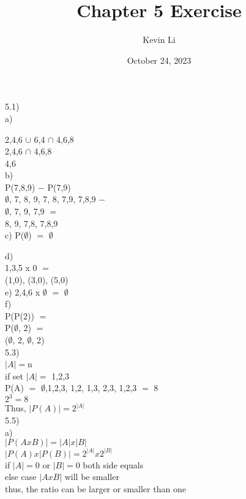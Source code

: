 \documentclass{article}
\title{Chapter 5 Exercise}
\author{Kevin Li}
\date{October 24, 2023}
\begin{document}
\maketitle
\pagebreak
\begin{spacing}{2}
  \begin{center}
  5.1)\\
  a)

  {2,4,6} $\cup$ {6,4} $\cap$ {4,6,8}\\
  {2,4,6} $\cap$ {4,6,8}\\
  {4,6}\\

  b)\\

  P({7,8,9}) $-$ P({7,9})\\
  {$\emptyset$, 7, 8, 9, {7, 8}, {7,9}, {7,8,9}} $-$\\
  {$\emptyset$, 7, 9, {7,9} $=$}\\
  {8, 9, {7,8}, {7,8,9}}\\

  c)
  P($\emptyset$) $=$ {$\emptyset$}
  
  d)\\
  {1,3,5} x {0} $=$\\
  {(1,0), (3,0), (5,0)}\\
  
  e)
  {2,4,6} x $\emptyset$ $=$
  $\emptyset$\\
  
  f)\\
  P(P({2})) $=$\\
  P($\emptyset$, 2) $=$\\
  ($\emptyset$, 2, {$\emptyset$, 2})\\

  5.3)\\
  $|A| = $n\\
  if set $|A| = $ {1,2,3}\\
  P(A) $=$ {$\emptyset$,1,2,3, {1,2}, {1,3}, {2,3}, {1,2,3}} $=$ 8\\
  $2^3 = 8$\\
  Thus, $|P(A)| = 2^{|A|}$ \\
  5.5)\\
  a) \\
  $|P(AxB)| = |A| x |B|$\\
  $|P(A)x|P(B)| = 2^{|A|} x 2^{|B|}$\\
  if $|A| = 0$ or $|B| = 0$ both side equals\\
  else case $|AxB|$ will be smaller\\
  thus, the ratio can be larger or smaller than one\\
  

\end{center}
\end{spacing}
\end{document}
